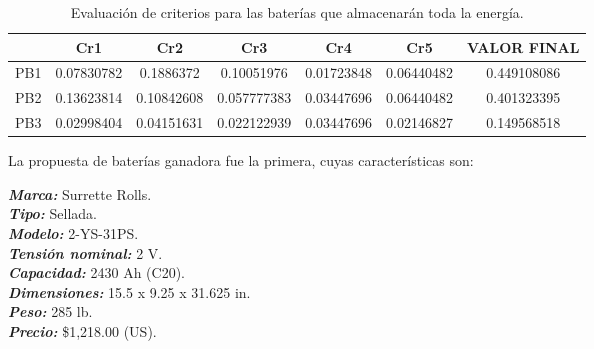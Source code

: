 \begin{table}[H]
	\centering
	\caption{Evaluación de criterios para las baterías que almacenarán toda la energía.}
	\begin{tabular}{|c|c|c|c|c|c|c|}
		\hline  
		\multicolumn{1}{|r|}{} & \cellcolor[rgb]{ .741,  .839,  .933}Cr1 & \cellcolor[rgb]{ .741,  .839,  .933}Cr2 & \cellcolor[rgb]{ .741,  .839,  .933}Cr3 & \cellcolor[rgb]{ .741,  .839,  .933}Cr4 & \cellcolor[rgb]{ .741,  .839,  .933}Cr5 & \cellcolor[rgb]{ .741,  .839,  .933}VALOR FINAL \\
		\hline
		\rowcolor[rgb]{ .659,  .816,  .553} PB1   & \cellcolor[rgb]{ 1,  .753,  0}0.07830782 & \cellcolor[rgb]{ 1,  .753,  0}0.1886372 & \cellcolor[rgb]{ 1,  .753,  0}0.10051976 & \cellcolor[rgb]{ 1,  .753,  0}0.01723848 & \cellcolor[rgb]{ 1,  .753,  0}0.06440482 & \cellcolor[rgb]{ 1,  .753,  0}0.449108086 \\
		\hline
		\rowcolor[rgb]{ .659,  .816,  .553} PB2   & \cellcolor[rgb]{ 1,  1,  1}0.13623814 & \cellcolor[rgb]{ 1,  1,  1}0.10842608 & \cellcolor[rgb]{ 1,  1,  1}0.057777383 & \cellcolor[rgb]{ 1,  1,  1}0.03447696 & \cellcolor[rgb]{ 1,  1,  1}0.06440482 & \cellcolor[rgb]{ 1,  1,  1}0.401323395 \\
		\hline
		\rowcolor[rgb]{ .659,  .816,  .553} PB3   & \cellcolor[rgb]{ 1,  1,  1}0.02998404 & \cellcolor[rgb]{ 1,  1,  1}0.04151631 & \cellcolor[rgb]{ 1,  1,  1}0.022122939 & \cellcolor[rgb]{ 1,  1,  1}0.03447696 & \cellcolor[rgb]{ 1,  1,  1}0.02146827 & \cellcolor[rgb]{ 1,  1,  1}0.149568518 \\
		\hline
	\end{tabular}%
	\label{tab:mm1}%
\end{table}

La propuesta de baterías ganadora fue la primera, cuyas características son:

\hspace*{1em}\textbf{\textit{Marca:}} Surrette Rolls.\\
\hspace*{2.5em}\textbf{\textit{Tipo:}} Sellada.\\
\hspace*{2.5em}\textbf{\textit{Modelo:}} 2-YS-31PS.\\
\hspace*{2.5em}\textbf{\textit{Tensión nominal:}} 2 V. \\
\hspace*{2.5em}\textbf{\textit{Capacidad:}} 2430 Ah (C20).\\
\hspace*{2.5em}\textbf{\textit{Dimensiones:}} 15.5 x 9.25 x 31.625 in.\\
\hspace*{2.5em}\textbf{\textit{Peso:}} 285 lb.\\
\hspace*{2.5em}\textbf{\textit{Precio:}} \$1,218.00 (US).\\

